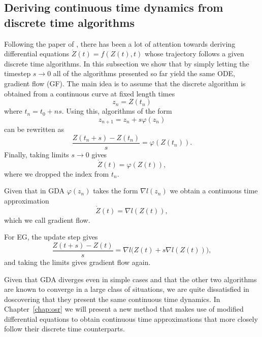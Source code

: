 \documentclass[main.tex]{subfiles}
\begin{document}
\subsection{Deriving continuous time dynamics from discrete time algorithms}
Following the paper of \cite{suDifferentialEquationModeling2016}, there has
been a lot of attention towards deriving differential equations $\dot Z(t) =
	f(Z(t), t)$ whose trajectory follows a given discrete time algorithms. In this
subsection we show that by simply letting the timestep $s \to 0$ all of the
algorithms presented so far yield the same ODE, gradient flow (GF). The main
idea is to assume that the discrete algorithm is obtained from a continuous
curve at fixed length times \[z_n = Z(t_n)\] where $t_n = t_0 + ns.$ Using
this, algorithms of the form \[z_{n+1} = z_n + s\varphi(z_n)\] can be rewritten
as \[\frac{Z(t_n + s) - Z(t_n)}{s} = \varphi(Z(t_n)).\] Finally, taking limits
$s \to 0$ gives \[\dot Z(t) = \varphi(Z(t)),\] where we dropped the index from
$t_n.$
\begin{ex}
	Given that in GDA $\varphi(z_n)$ takes the form $\nabla l(z_n)$ we obtain a
	continuous time approximation \[\dot Z(t) = \nabla l(Z(t)),\] which we call gradient flow.
\end{ex}
\begin{ex}
	For EG, the update step gives \[\frac{Z(t + s) - Z(t)}{s} = \nabla l
		\big(Z(t) + s \nabla l(Z(t))\big),\]
	and taking the limits gives gradient flow again.
\end{ex}
  Given that GDA diverges even in simple cases and that the
other two algorithms are known to converge in a large class of situations, we
are quite dissatisfied in doscovering that they present the same continuous
time dynamics.
In Chapter~\ref{chap:osr} we will present a new method that makes use of
modified differential equations to obtain continuous time approximations that
more closely follow their discrete time counterparts.
\end{document}
